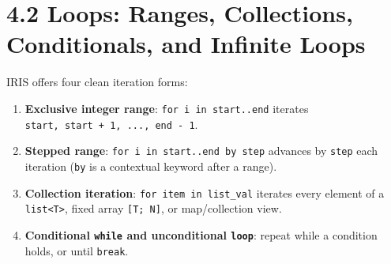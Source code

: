 \documentclass[
  english,
  oneside]{book}
\providecommand{\tightlist}{%
  \setlength{\itemsep}{0pt}\setlength{\parskip}{0pt}}
\begin{document}
\section{4.2 Loops: Ranges, Collections, Conditionals, and Infinite
Loops}\label{loops-ranges-collections-conditionals-and-infinite-loops}

IRIS offers four clean iteration forms:

\begin{enumerate}
\def\labelenumi{\arabic{enumi}.}
\tightlist
\item
  \textbf{Exclusive integer range}: \texttt{for\ i\ in\ start..end}
  iterates \texttt{start,\ start\ +\ 1,\ ...,\ end\ -\ 1}.
\item
  \textbf{Stepped range}: \texttt{for\ i\ in\ start..end\ by\ step}
  advances by \texttt{step} each iteration (\texttt{by} is a contextual
  keyword after a range).
\item
  \textbf{Collection iteration}: \texttt{for\ item\ in\ list\_val}
  iterates every element of a \texttt{list\textless{}T\textgreater{}},
  fixed array \texttt{{[}T;\ N{]}}, or map/collection view.
\item
  \textbf{Conditional \texttt{while} and unconditional \texttt{loop}}:
  repeat while a condition holds, or until \texttt{break}.
\end{enumerate}
\end{document}
